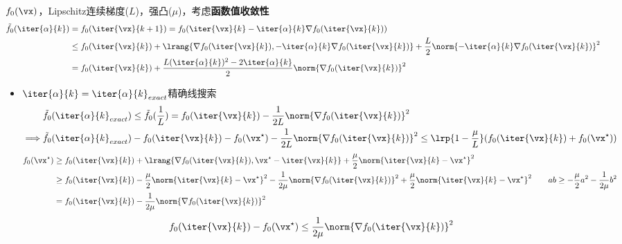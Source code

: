 \bigskip
$f_0(\vx)$，Lipschitz连续梯度($L$)，强凸($\mu$)，考虑\textbf{函数值收敛性}
\[\begin{aligned}
    \tilde{f}_0(\iter{\alpha}{k})&=f_0(\iter{\vx}{k+1})=f_0(\iter{\vx}{k}-\iter{\alpha}{k}\nabla f_0(\iter{\vx}{k}))\\
    &\leq f_0(\iter{\vx}{k})+\lrang{\nabla f_0(\iter{\vx}{k}),-\iter{\alpha}{k}\nabla f_0(\iter{\vx}{k})}+\frac{L}{2}\norm{-\iter{\alpha}{k}\nabla f_0(\iter{\vx}{k})}^2\\
    &=f_0(\iter{\vx}{k})+\frac{L(\iter{\alpha}{k})^2-2\iter{\alpha}{k}}{2}\norm{\nabla f_0(\iter{\vx}{k})}^2
\end{aligned}\]

\begin{itemize}
\item $\iter{\alpha}{k}=\iter{\alpha}{k}_{exact}$精确线搜索
\[\begin{aligned}
    &\tilde{f}_0(\iter{\alpha}{k}_{exact})\leq\tilde{f}_0(\frac{1}{L})=f_0(\iter{\vx}{k})-\frac{1}{2L}\norm{\nabla f_0(\iter{\vx}{k})}^2\\
    \implies&\tilde{f}_0(\iter{\alpha}{k}_{exact})-f_0(\iter{\vx}{k})-f_0(\vx^\star)-\frac{1}{2L}\norm{\nabla f_0(\iter{\vx}{k})}^2
    \leq \lrp{1-\frac{\mu}{L}}(f_0(\iter{\vx}{k})+f_0(\vx^\star))
\end{aligned}\]
\[\begin{aligned}
    f_0(\vx^\star)&\geq f_0(\iter{\vx}{k})+\lrang{\nabla f_0(\iter{\vx}{k}),\vx^\star-\iter{\vx}{k}}+\frac{\mu}{2}\norm{\iter{\vx}{k}-\vx^\star}^2\\
    &\geq f_0(\iter{\vx}{k})-\frac{\mu}{2}\norm{\iter{\vx}{k}-\vx^\star}^2-\frac{1}{2\mu}\norm{\nabla f_0(\iter{\vx}{k})}^2+\frac{\mu}{2}\norm{\iter{\vx}{k}-\vx^\star}^2\qquad ab\geq-\frac{\mu}{2}a^2-\frac{1}{2\mu}b^2\\
    &= f_0(\iter{\vx}{k})-\frac{1}{2\mu}\norm{\nabla f_0(\iter{\vx}{k})}^2
\end{aligned}\]
\[f_0(\iter{\vx}{k})-f_0(\vx^\star)\leq\frac{1}{2\mu}\norm{\nabla f_0(\iter{\vx}{k})}^2\]


\end{itemize}
